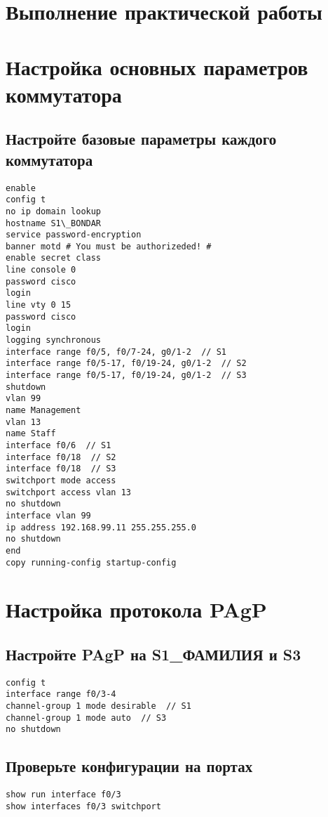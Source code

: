 \section{Выполнение практической работы}

\section{Настройка основных параметров коммутатора}

\subsection{Настройте базовые параметры каждого коммутатора}

\begin{verbatim}
enable
config t
no ip domain lookup
hostname S1\_BONDAR
service password-encryption
banner motd # You must be authorizeded! #
enable secret class
line console 0
password cisco
login
line vty 0 15
password cisco
login
logging synchronous
interface range f0/5, f0/7-24, g0/1-2  // S1
interface range f0/5-17, f0/19-24, g0/1-2  // S2
interface range f0/5-17, f0/19-24, g0/1-2  // S3
shutdown
vlan 99
name Management
vlan 13
name Staff
interface f0/6  // S1
interface f0/18  // S2
interface f0/18  // S3
switchport mode access
switchport access vlan 13
no shutdown
interface vlan 99
ip address 192.168.99.11 255.255.255.0
no shutdown
end
copy running-config startup-config
\end{verbatim}

\section{Настройка протокола PAgP}
\subsection{Настройте PAgP на S1\_ФАМИЛИЯ и S3}

\begin{verbatim}
config t
interface range f0/3-4
channel-group 1 mode desirable  // S1
channel-group 1 mode auto  // S3
no shutdown
\end{verbatim}

\subsection{Проверьте конфигурации на портах}

\begin{verbatim}
show run interface f0/3
show interfaces f0/3 switchport
\end{verbatim}


